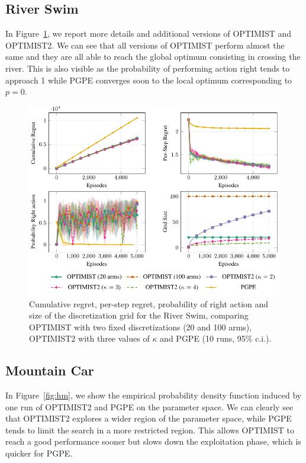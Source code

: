 \documentclass{article}
\makeatletter
\DeclareRobustCommand{\algoname}{OPTIMIST\@\xspace}
\makeatother
\begin{document}
\subsection{River Swim}
\label{apx:expRS}
In Figure~\ref{fig:rs_exp}, we report more details and additional versions of OPTIMIST and OPTIMIST2. We can see that all versions of OPTIMIST perform almost the same and they are all able to reach the global optimum consisting in crossing the river. This is also visible as the probability of performing action right tends to approach 1 while PGPE converges soon to the local optimum corresponding to $p=0$.

\begin{figure}[h!] 
\vskip 0.2in
    \centering
    \includegraphics[width=0.8\linewidth]{plots/riverswim/plot.pdf}
    \caption{Cumulative regret, per-step regret, probability of right action and size of the discretization grid for the River Swim, comparing \algoname with two fixed discretizations (20 and 100 arms), OPTIMIST2 with three values of $\kappa$ and PGPE (10 runs, 95\% c.i.).} 
    \label{fig:rs_exp} 
  \vskip -0.2in
\end{figure}

\subsection{Mountain Car}
In Figure~\ref{fig:hm}, we show the empirical probability density function induced by one run of OPTIMIST2 and PGPE on the parameter space. We can clearly see that OPTIMIST2 explores a wider region of the parameter space, while PGPE tends to limit the search in a more restricted region. This allows OPTIMIST to reach a good performance sooner but slows down the exploitation phase, which is quicker for PGPE.
\end{document}
